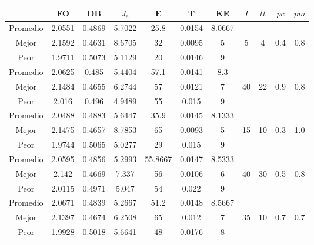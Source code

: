 \begin{table}[h!]
    \footnotesize
    \begin{center}
        \begin{tabular}{|c|c|c|c|c|c|c|c|c|c|c|}
        \hline
             & {\bf FO} & {\bf DB} & $J_e$ & {\bf E} & {\bf T} & {\bf KE} & $I$ & $tt$ & $pc$ & $pm$ \\
        \hline
        \hline
            Promedio  & 2.0551 & 0.4869 & 5.7022 & 25.8 & 0.0154 & 8.0667 &  &  &  & \\
            \cline{1-7}
            Mejor & 2.1592 & 0.4631  & 8.6705 & 32 & 0.0095 & 5 & 5 & 4 & 0.4 & 0.8\\
            \cline{1-7}
            Peor & 1.9711 & 0.5073  & 5.1129 & 20 & 0.0146 & 9 &  &  &  & \\
        \hline
        \hline
            Promedio  & 2.0625 & 0.485 & 5.4404 & 57.1 & 0.0141 & 8.3 &  &  &  & \\
            \cline{1-7}
            Mejor & 2.1484 & 0.4655  & 6.2744 & 57 & 0.0121 & 7 & 40 & 22 & 0.9 & 0.8\\
            \cline{1-7}
            Peor & 2.016 & 0.496  & 4.9489 & 55 & 0.015 & 9 &  &  &  & \\
        \hline
        \hline
            Promedio  & 2.0488 & 0.4883 & 5.6447 & 35.9 & 0.0145 & 8.1333 &  &  &  & \\
            \cline{1-7}
            Mejor & 2.1475 & 0.4657  & 8.7853 & 65 & 0.0093 & 5 & 15 & 10 & 0.3 & 1.0\\
            \cline{1-7}
            Peor & 1.9744 & 0.5065  & 5.0277 & 29 & 0.015 & 9 &  &  &  & \\
        \hline
        \hline
            Promedio  & 2.0595 & 0.4856 & 5.2993 & 55.8667 & 0.0147 & 8.5333 &  &  &  & \\
            \cline{1-7}
            Mejor & 2.142 & 0.4669  & 7.337 & 56 & 0.0106 & 6 & 40 & 30 & 0.5 & 0.8\\
            \cline{1-7}
            Peor & 2.0115 & 0.4971  & 5.047 & 54 & 0.022 & 9 &  &  &  & \\
        \hline
        \hline
            Promedio  & 2.0671 & 0.4839 & 5.2667 & 51.2 & 0.0148 & 8.5667 &  &  &  & \\
            \cline{1-7}
            Mejor & 2.1397 & 0.4674  & 6.2508 & 65 & 0.012 & 7 & 35 & 10 & 0.7 & 0.7\\
            \cline{1-7}
            Peor & 1.9928 & 0.5018  & 5.6641 & 48 & 0.0176 & 8 &  &  &  & \\

\end{tabular}
\end{center}
\end{table}

